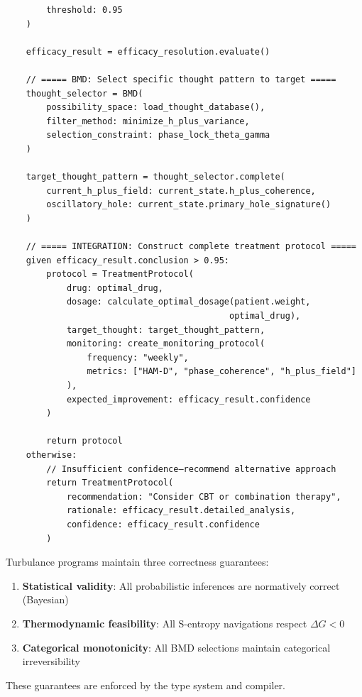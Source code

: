 \begin{verbatim}
        threshold: 0.95
    )

    efficacy_result = efficacy_resolution.evaluate()

    // ===== BMD: Select specific thought pattern to target =====
    thought_selector = BMD(
        possibility_space: load_thought_database(),
        filter_method: minimize_h_plus_variance,
        selection_constraint: phase_lock_theta_gamma
    )

    target_thought_pattern = thought_selector.complete(
        current_h_plus_field: current_state.h_plus_coherence,
        oscillatory_hole: current_state.primary_hole_signature()
    )

    // ===== INTEGRATION: Construct complete treatment protocol =====
    given efficacy_result.conclusion > 0.95:
        protocol = TreatmentProtocol(
            drug: optimal_drug,
            dosage: calculate_optimal_dosage(patient.weight,
                                            optimal_drug),
            target_thought: target_thought_pattern,
            monitoring: create_monitoring_protocol(
                frequency: "weekly",
                metrics: ["HAM-D", "phase_coherence", "h_plus_field"]
            ),
            expected_improvement: efficacy_result.confidence
        )

        return protocol
    otherwise:
        // Insufficient confidence—recommend alternative approach
        return TreatmentProtocol(
            recommendation: "Consider CBT or combination therapy",
            rationale: efficacy_result.detailed_analysis,
            confidence: efficacy_result.confidence
        )
\end{verbatim}

\begin{theorem}
\label{thm:program_correctness}
Turbulance programs maintain three correctness guarantees:

\begin{enumerate}
\item \textbf{Statistical validity}: All probabilistic inferences are normatively correct (Bayesian)
\item \textbf{Thermodynamic feasibility}: All S-entropy navigations respect $\Delta G < 0$
\item \textbf{Categorical monotonicity}: All BMD selections maintain categorical irreversibility
\end{enumerate}

These guarantees are enforced by the type system and compiler.
\end{theorem}

